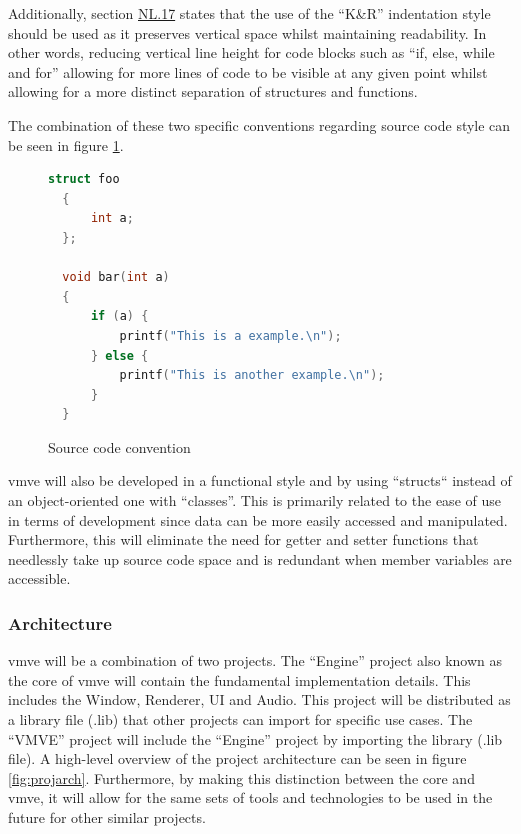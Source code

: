 \documentclass[11pt]{article}
\begin{document}
Additionally, section
\href{https://isocpp.github.io/CppCoreGuidelines/CppCoreGuidelines#nl17-use-kr-derived-layout}{NL.17}
states that the use of the ``K\&R''  indentation style \cite{indentation} should
be used as it preserves vertical space whilst maintaining readability. In other
words, reducing vertical line height for code blocks such as ``if, else, while
and for'' allowing for more lines of code to be visible at any given point
whilst allowing for a more distinct separation of structures and functions.

The combination of these two specific conventions regarding source code style
can be seen in figure \ref{fig:convention}.

\begin{figure}[H]
\centering
\begin{lstlisting}[language=C++]
  struct foo
  {
      int a;
  };

  void bar(int a)
  {
      if (a) {
          printf("This is a example.\n");
      } else {
          printf("This is another example.\n");
      }
  }
\end{lstlisting}
\caption{Source code convention}
\label{fig:convention}
\end{figure}

\gls*{vmve} will also be developed in a functional style and by using ``structs``
instead of an object-oriented one with ``classes''. This is primarily related to
the ease of use in terms of development since data can be more easily accessed
and manipulated. Furthermore, this will eliminate the need for getter and setter
functions that needlessly take up source code space and is redundant when member
variables are accessible.

\subsubsection{Architecture}
\gls*{vmve} will be a combination of two projects. The ``Engine'' project also
known as the core of \gls*{vmve} will contain the fundamental implementation
details. This includes the Window, Renderer, UI and Audio. This project will be
distributed as a library file (.lib) that other projects can import for specific
use cases. The ``VMVE'' project will include the ``Engine'' project by importing
the library (.lib file). A high-level overview of the project architecture can
be seen in figure \ref{fig:projarch}. Furthermore, by making this distinction
between the core and \gls*{vmve}, it will allow for the same sets of tools and
technologies to be used in the future for other similar projects.
\end{document}
